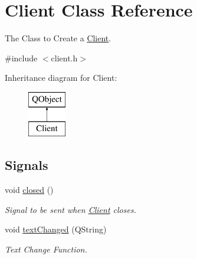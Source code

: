 \hypertarget{classClient}{\section{Client Class Reference}
\label{classClient}
}


The Class to Create a \hyperlink{classClient}{Client}.  




{\ttfamily \#include $<$client.\-h$>$}

Inheritance diagram for Client\-:\begin{figure}[H]
\begin{center}
\leavevmode
\includegraphics[height=2.000000cm]{classClient}
\end{center}
\end{figure}
\subsection*{Signals}
\begin{DoxyCompactItemize}
\item 
\hypertarget{classClient_ab1fad07406e7086043ac689a03005480}{void \hyperlink{classClient_ab1fad07406e7086043ac689a03005480}{closed} ()}\label{classClient_ab1fad07406e7086043ac689a03005480}

\begin{DoxyCompactList}\small\item\em Signal to be sent when \hyperlink{classClient}{Client} closes. \end{DoxyCompactList}\item 
\hypertarget{classClient_ad6da73c1bc1ff62071e24825a4254433}{void \hyperlink{classClient_ad6da73c1bc1ff62071e24825a4254433}{text\-Changed} (Q\-String)}\label{classClient_ad6da73c1bc1ff62071e24825a4254433}

\begin{DoxyCompactList}\small\item\em Text Change Function. \end{DoxyCompactList}\end{DoxyCompactItemize}
